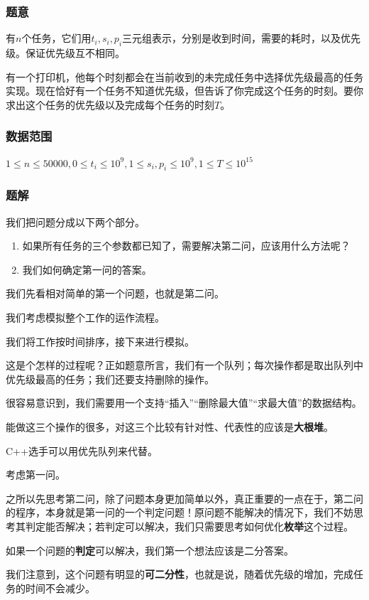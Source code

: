 \documentclass{ctexart}
\begin{document}
\subsubsection{题意}
有$n$个任务，它们用$t_i,s_i,p_i$三元组表示，分别是收到时间，需要的耗时，以及优先级。保证优先级互不相同。

有一个打印机，他每个时刻都会在当前收到的未完成任务中选择优先级最高的任务实现。现在恰好有一个任务不知道优先级，但告诉了你完成这个任务的时刻。要你求出这个任务的优先级以及完成每个任务的时刻$T$。
\subsubsection{数据范围}
$1 \le n \le 50000,0\le t_i \le 10^9,1 \le s_i,p_i \le 10^9,1 \le T \le 10^{15}$
\subsubsection{题解}
我们把问题分成以下两个部分。

\begin{enumerate}
\item 如果所有任务的三个参数都已知了，需要解决第二问，应该用什么方法呢？
\item 我们如何确定第一问的答案。
\end{enumerate}

我们先看相对简单的第一个问题，也就是第二问。

我们考虑模拟整个工作的运作流程。

我们将工作按时间排序，接下来进行模拟。

这是个怎样的过程呢？正如题意所言，我们有一个队列；每次操作都是取出队列中优先级最高的任务；我们还要支持删除的操作。

很容易意识到，我们需要用一个支持``插入''``删除最大值''``求最大值''的数据结构。

能做这三个操作的很多，对这三个比较有针对性、代表性的应该是{\textbf{大根堆}}。

C++选手可以用优先队列来代替。

考虑第一问。

之所以先思考第二问，除了问题本身更加简单以外，真正重要的一点在于，第二问的程序，本身就是第一问的一个判定问题！原问题不能解决的情况下，我们不妨思考其判定能否解决；若判定可以解决，我们只需要思考如何优化{\textbf{枚举}}这个过程。

如果一个问题的{\textbf{判定}}可以解决，我们第一个想法应该是二分答案。

我们注意到，这个问题有明显的{\textbf{可二分性}}，也就是说，随着优先级的增加，完成任务的时间不会减少。
\end{document}
